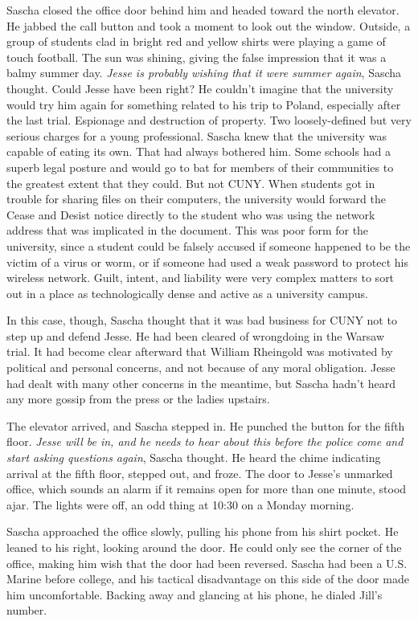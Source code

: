 \documentclass[12pt]{book}
\begin{document}
Sascha closed the office door behind him and headed toward the north elevator.  He jabbed the call button and took a moment to look out the window.  Outside, a group of students clad in bright red and yellow shirts were playing a game of touch football.  The sun was shining, giving the false impression that it was a balmy summer day.  \emph{Jesse is probably wishing that it were summer again}, Sascha thought.  Could Jesse have been right?  He couldn't imagine that the university would try him again for something related to his trip to Poland, especially after the last trial.  Espionage and destruction of property.  Two loosely-defined but very serious charges for a young professional.  Sascha knew that the university was capable of eating its own.  That had always bothered him.  Some schools had a superb legal posture and would go to bat for members of their communities to the greatest extent that they could.  But not CUNY.  When students got in trouble for sharing files on their computers, the university would forward the Cease and Desist notice directly to the student who was using the network address that was implicated in the document.  This was poor form for the university, since a student could be falsely accused if someone happened to be the victim of a virus or worm, or if someone had used a weak password to protect his wireless network.  Guilt, intent, and liability were very complex matters to sort out in a place as technologically dense and active as a university campus.

In this case, though, Sascha thought that it was bad business for CUNY not to step up and defend Jesse.  He had been cleared of wrongdoing in the Warsaw trial.  It had become clear afterward that William Rheingold was motivated by political and personal concerns, and not because of any moral obligation.  Jesse had dealt with many other concerns in the meantime, but Sascha hadn't heard any more gossip from the press or the ladies upstairs.

The elevator arrived, and Sascha stepped in.  He punched the button for the fifth floor.  \emph{Jesse will be in, and he needs to hear about this before the police come and start asking questions again}, Sascha thought.  He heard the chime indicating arrival at the fifth floor, stepped out, and froze.  The door to Jesse's unmarked office, which sounds an alarm if it remains open for more than one minute, stood ajar.  The lights were off, an odd thing at 10:30 on a Monday morning.

Sascha approached the office slowly, pulling his phone from his shirt pocket.  He leaned to his right, looking around the door.  He could only see the corner of the office, making him wish that the door had been reversed.  Sascha had been a U.S. Marine before college, and his tactical disadvantage on this side of the door made him uncomfortable.  Backing away and glancing at his phone, he dialed Jill's number.
\end{document}
